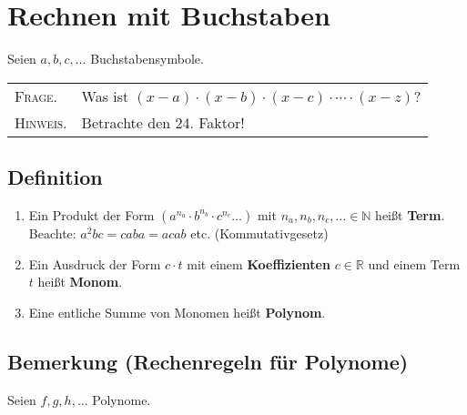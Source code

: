 \section{Rechnen mit Buchstaben}

Seien $a,b,c,\dots$ Buchstabensymbole.\\

\begin{tabular}{ll}
\textsc{Frage.} & Was ist $(x-a) \cdot (x-b) \cdot (x-c) \cdot  \cdots \cdot (x-z)$?\\
\textsc{Hinweis.}& Betrachte den 24. Faktor!
\end{tabular}


\subsection[Definition Term/Koeffizient/Monom/Polynom]{Definition}
	
	\begin{enumerate}
	\item Ein Produkt der Form $(a^{n_a}\cdot b^{n_b}\cdot c^{n_c} \ldots)$ mit $n_a,n_b,n_c,\ldots \in \mathbb{N}$
	 heißt \textbf{Term}.	\\
	 Beachte: $a^2bc=caba=acab$ etc. (Kommutativgesetz)
	 
	 \item Ein Ausdruck der Form $c\cdot t$ mit einem \textbf{Koeffizienten} $c\in \mathbb{R}$ 
	 und einem Term $t$ heißt \textbf{Monom}.
	 \item Eine entliche Summe von Monomen heißt \textbf{Polynom}.	
	
	\end{enumerate}
	
	
\subsection[Rechenregeln für Polynome]{Bemerkung (Rechenregeln für Polynome)}

	Seien $f,g,h,\dots$ Polynome.

